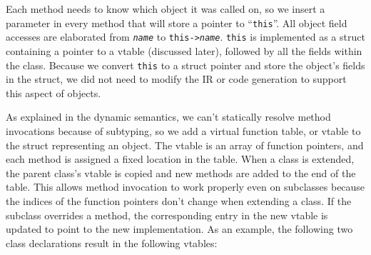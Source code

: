 \documentclass{article}
\begin{document}
Each method needs to know which object it was called on, so we insert a
parameter in every method that will store a pointer to ``\texttt{this}''.
All object field accesses are elaborated from \texttt{\emph{name}} to
\texttt{this->\emph{name}}. \texttt{this} is implemented as a struct containing
a pointer to a vtable (discussed later), followed by all the fields within the
class. Because we convert \texttt{this} to a struct pointer and store the
object's fields in the struct, we did not need to modify the IR or code
generation to support this aspect of objects.

As explained in the dynamic semantics, we can't statically resolve method
invocations because of subtyping, so we add a virtual function table, or vtable
to the struct representing an object. The vtable is an array of function
pointers, and each method is assigned a fixed location in the table. When a
class is extended, the parent class's vtable is copied and new methods are
added to the end of the table. This allows method invocation to work properly
even on subclasses because the indices of the function pointers don't change
when extending a class. If the subclass overrides a method, the corresponding
entry in the new vtable is updated to point to the new implementation. As an
example, the following two class declarations result in the following vtables:
\end{document}
